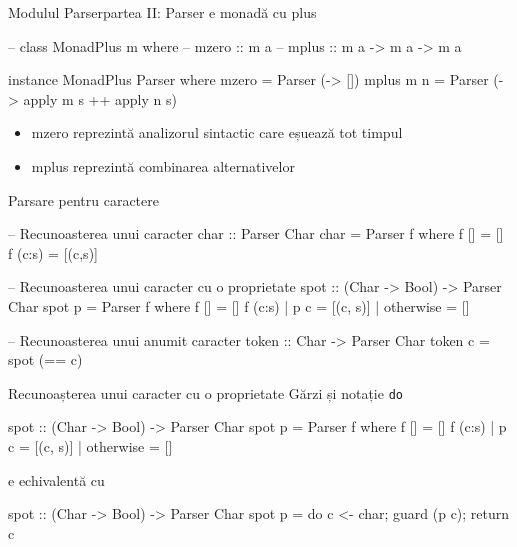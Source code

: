 \documentclass[xcolor=pdftex,romanian,colorlinks]{beamer}
\begin{document}

\begin{frame}[fragile]{Modulul Parser}{partea II: Parser e monadă cu plus}
\begin{asciihs}
  --   class MonadPlus m where
  --     mzero :: m a
  --     mplus :: m a -> m a -> m a

  instance MonadPlus Parser where
    mzero      = Parser (\s -> [])
    mplus m n  = Parser (\s -> apply m s ++ apply n s)
\end{asciihs}

\begin{itemize}
\item mzero reprezintă analizorul sintactic care eșuează tot timpul
\item mplus reprezintă combinarea alternativelor
\end{itemize}

\end{frame}


%

\begin{frame}[fragile]{Parsare pentru caractere}
\begin{asciihs}
  -- Recunoasterea unui caracter
  char :: Parser Char
  char = Parser f
    where
    f []     = []
    f (c:s) = [(c,s)]

  -- Recunoasterea unui caracter cu o proprietate
  spot :: (Char -> Bool) -> Parser Char
  spot p = Parser f
    where
    f []                 = []
    f (c:s) | p c        = [(c, s)]
            | otherwise = []

  -- Recunoasterea unui anumit caracter
  token :: Char -> Parser Char
  token c = spot (== c)
\end{asciihs}
\end{frame}




\begin{frame}[fragile]{Recunoașterea unui caracter cu o proprietate}
{Gărzi și notație \lstinline$do$}
\begin{asciihs}
  spot :: (Char -> Bool) -> Parser Char
  spot p = Parser f
    where
    f []                 = []
    f (c:s) | p c        = [(c, s)]
            | otherwise = []
\end{asciihs}
e echivalentă cu
\begin{asciihs}
  spot :: (Char -> Bool) -> Parser Char
  spot p = do { c <- char; guard (p c); return c }
\end{asciihs}
\end{frame}
\end{document}

